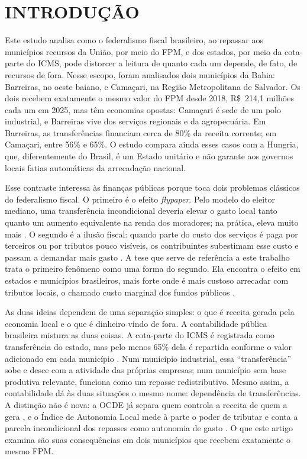 \section{INTRODUÇÃO}\label{sec:introducao}

Este estudo analisa como o federalismo fiscal brasileiro, ao repassar aos municípios recursos da União, por meio do FPM, e dos estados, por meio da cota-parte do ICMS, pode distorcer a leitura de quanto cada um depende, de fato, de recursos de fora. Nesse escopo, foram analisados dois municípios da Bahia: Barreiras, no oeste baiano, e Camaçari, na Região Metropolitana de Salvador. Os dois recebem exatamente o mesmo valor do FPM desde 2018, R\$~214,1 milhões cada um em 2025, mas têm economias opostas: Camaçari é sede de um polo industrial, e Barreiras vive dos serviços regionais e da agropecuária. Em Barreiras, as transferências financiam cerca de 80\% da receita corrente; em Camaçari, entre 56\% e 65\%. O estudo compara ainda esses casos com a Hungria, que, diferentemente do Brasil, é um Estado unitário e não garante aos governos locais fatias automáticas da arrecadação nacional.

Esse contraste interessa às finanças públicas porque toca dois problemas clássicos do federalismo fiscal. O primeiro é o efeito \textit{flypaper}. Pelo modelo do eleitor mediano, uma transferência incondicional deveria elevar o gasto local tanto quanto um aumento equivalente na renda dos moradores; na prática, eleva muito mais \citep{HinesThaler1995}. O segundo é a ilusão fiscal: quando parte do custo dos serviços é paga por terceiros ou por tributos pouco visíveis, os contribuintes subestimam esse custo e passam a demandar mais gasto \citep{DolleryWorthington1996}. A tese que serve de referência a este trabalho trata o primeiro fenômeno como uma forma do segundo. Ela encontra o efeito em estados e municípios brasileiros, mais forte onde é mais custoso arrecadar com tributos locais, o chamado custo marginal dos fundos públicos \citep{Ferreira2021}.

As duas ideias dependem de uma separação simples: o que é receita gerada pela economia local e o que é dinheiro vindo de fora. A contabilidade pública brasileira mistura as duas coisas. A cota-parte do ICMS é registrada como transferência do estado, mas pelo menos 65\% dela é repartida conforme o valor adicionado em cada município \citep{CF1988art158}. Num município industrial, essa ``transferência'' sobe e desce com a atividade das próprias empresas; num município sem base produtiva relevante, funciona como um repasse redistributivo. Mesmo assim, a contabilidade dá às duas situações o mesmo nome: dependência de transferências. A distinção não é nova: a OCDE já separa quem controla a receita de quem a gera \citep{BlochligerKing2006}, e o Índice de Autonomia Local mede à parte o poder de tributar e conta a parcela incondicional dos repasses como autonomia de gasto \citep{Ladner2016}. O que este artigo examina são suas consequências em dois municípios que recebem exatamente o mesmo FPM.

